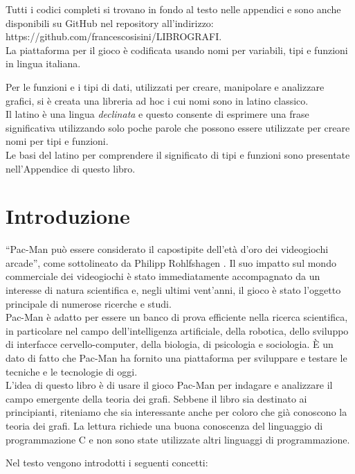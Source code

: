 \documentclass[8pt]{book}
\begin{document}
Tutti i codici completi si trovano in fondo al testo nelle appendici e sono anche disponibili su GitHub nel repository all'indirizzo: https://github.com/francescosisini/LIBROGRAFI.\\

La piattaforma per il gioco è codificata usando nomi per variabili, tipi e funzioni in lingua italiana.

Per le funzioni e i tipi di dati, utilizzati per creare, manipolare e analizzare grafici, si è creata una libreria ad hoc i cui nomi sono in latino classico.\\
Il latino è una lingua \emph{declinata} e questo consente di esprimere una frase significativa utilizzando solo poche parole che possono essere utilizzate per creare nomi per tipi e funzioni.\\
Le basi del latino per comprendere il significato di tipi e funzioni sono presentate nell'Appendice di questo libro.

\newpage
\chapter*{Introduzione}


``Pac-Man può essere considerato il capostipite dell'età d'oro dei videogiochi arcade'', come sottolineato da Philipp Rohlfshagen \cite{Rohlfshagen}. Il suo impatto sul mondo commerciale dei videogiochi è stato immediatamente accompagnato da un interesse di natura scientifica e, negli ultimi vent'anni, il gioco è stato l'oggetto principale di numerose ricerche e studi.\\
Pac-Man è adatto per essere un banco di prova efficiente nella ricerca scientifica, in particolare nel campo dell'intelligenza artificiale, della robotica, dello sviluppo di interfacce cervello-computer, della biologia, di psicologia e sociologia. È un dato di fatto che Pac-Man ha fornito una piattaforma per sviluppare e testare le tecniche e le tecnologie di oggi.\\

L'idea di questo libro è di usare il gioco Pac-Man per indagare e analizzare il campo emergente della teoria dei grafi. Sebbene il libro sia destinato ai principianti, riteniamo che sia interessante anche per coloro che già conoscono la teoria dei grafi. La lettura richiede una buona conoscenza del linguaggio di programmazione C e non sono state utilizzate altri linguaggi di programmazione.

Nel testo vengono introdotti i seguenti concetti:
\end{document}

